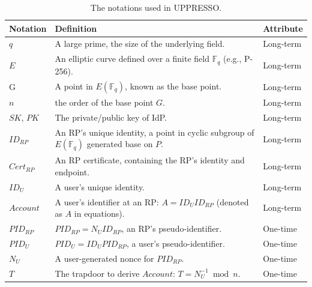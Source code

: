 \begin{table}[tb]
\scriptsize
    \caption{The notations used in UPPRESSO.}
    \centering
    \setlength{\tabcolsep}{1.2mm}
    \begin{tabular}{|p{1cm}|p{5.5cm}|p{1.1cm}|}
    \hline
    {\textbf{Notation}} & {\textbf{Definition}} & {\textbf{Attribute}} \\
    \hline
    {$q$} & {A large prime, the size of the underlying field.} & {Long-term} \\
    \hline
    {$E$}&{An elliptic curve defined over a finite field $\mathbb{F}_q$ (e.g., P-256).}&{Long-term}
     \\
    \hline
    {G}&{A point in $E(\mathbb{F}_q)$,  known as the base point.}&{Long-term}\\
    \hline
    {$n$} & {the order of the base point $G$.} & {Long-term} \\
    \hline
    {$SK$, $PK$} & {The private/public key of IdP. } & {Long-term} \\
    \hline
   {$ID_{RP}$} & {An RP's unique identity,  a point in cyclic subgroup of $E(\mathbb{F}_q)$ generated base on  $P$.} & {Long-term} \\
    \hline
    {$Cert_{RP}$} & {An RP certificate, containing the RP's identity and endpoint.} & {Long-term} \\
    \hline
    {$ID_U$} & {A user's unique identity.} & {Long-term} \\
    \hline
     {$Account$} & {A user's identifier at an RP: $A=  {ID_U}{ID_{RP}} $ (denoted as $A$ in equations).} & {Long-term} \\
    \hline
    {$PID_{RP}$} & {$PID_{RP} = {N_{U}}{ID_{RP}} $, an RP's pseudo-identifier.} & {One-time} \\
    \hline
    {$PID_U$} & {$PID_U = {ID_U}{PID_{RP}}$, a user's pseudo-identifier.} & {One-time}\\
    \hline
    {$N_U$} & {A user-generated nonce for $PID_{RP}$.} & {One-time} \\
    \hline
    {$T$} & {The trapdoor to derive $Account$: $T=N_U^{-1} \bmod n$.} & {One-time} \\
    \hline
    \end{tabular}
    \label{tbl:notations}
    \vspace{-5mm}
\end{table}


